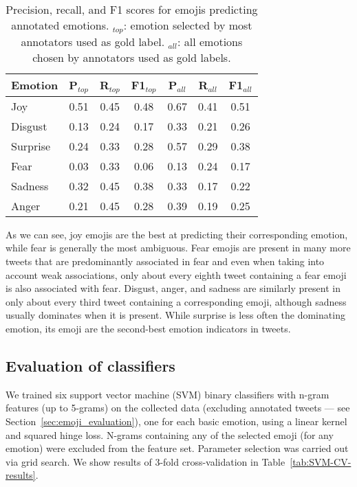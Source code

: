 \documentclass[10pt, a4paper]{article}
\begin{document}
\begin{table}[!ht]
\centering
\begin{tabular}{l | c | c | c | c | c | c}
\textbf{Emotion} & \textbf{P$_{top}$} & \textbf{R$_{top}$} & \textbf{F1$_{top}$} & \textbf{P$_{all}$} & \textbf{R$_{all}$} & \textbf{F1$_{all}$} \\\hline
Joy & 0.51 & 0.45 & 0.48 & 0.67 & 0.41 & 0.51 \\
Disgust & 0.13 & 0.24 & 0.17 & 0.33 & 0.21 & 0.26 \\
Surprise & 0.24 & 0.33 & 0.28 & 0.57 & 0.29 & 0.38 \\
Fear & 0.03 & 0.33 & 0.06 & 0.13 & 0.24 & 0.17 \\
Sadness & 0.32 & 0.45 & 0.38 & 0.33 & 0.17 & 0.22 \\
Anger & 0.21 & 0.45 & 0.28 & 0.39 & 0.19 & 0.25
\end{tabular}
\caption{Precision, recall, and F1 scores for emojis predicting annotated emotions. $_{top}$: emotion selected by most annotators used as gold label. $_{all}$: all emotions chosen by annotators used as gold labels.}
\label{tab:precision_emojis}
\end{table}

As we can see, joy emojis are the best at predicting their corresponding emotion, while fear is generally the most ambiguous. Fear emojis are present in many more tweets that are predominantly associated in fear and even when taking into account weak associations, only about every eighth tweet containing a fear emoji is also associated with fear. Disgust, anger, and sadness are similarly present in only about every third tweet containing a corresponding emoji, although sadness usually dominates when it is present. While surprise is less often the dominating emotion, its emoji are the second-best emotion indicators in tweets.

\subsection{Evaluation of classifiers}
\label{sec:classifier_evaluation}
We trained six support vector machine (SVM) binary classifiers with n-gram features (up to 5-grams) on the collected data (excluding annotated tweets --- see Section~\ref{sec:emoji_evaluation}), one for each basic emotion, using a linear kernel and squared hinge loss.
N-grams containing any of the selected emoji (for any emotion) were excluded from the feature set.
Parameter selection was carried out via grid search. We show results of 3-fold cross-validation in Table~\ref{tab:SVM-CV-results}.
\end{document}
